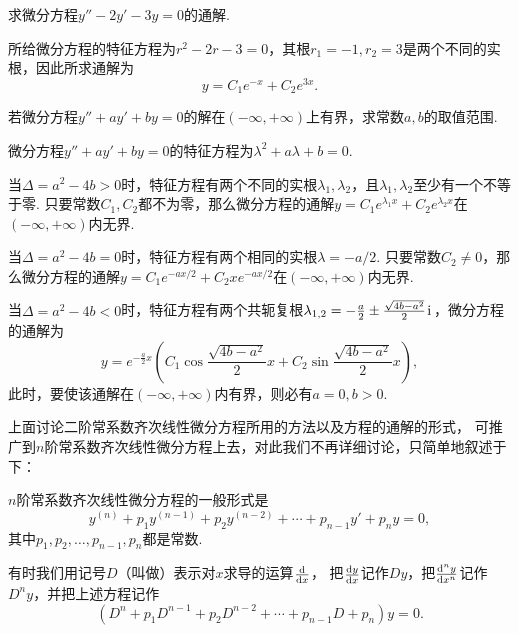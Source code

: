 \begin{example}
求微分方程\(y'' - 2y' - 3y = 0\)的通解.
\begin{solution}
所给微分方程的特征方程为\(r^2-2r-3=0\)，其根\(r_1=-1, r_2=3\)是两个不同的实根，因此所求通解为\[
y = C_1 e^{-x} + C_2 e^{3x}.
\]
\end{solution}
\end{example}

\begin{example}
若微分方程\(y''+ay'+by=0\)的解在\((-\infty,+\infty)\)上有界，求常数\(a,b\)的取值范围.
\begin{solution}
微分方程\(y''+ay'+by=0\)的特征方程为\(\lambda^2 + a\lambda+b = 0\).

当\(\Delta=a^2-4b>0\)时，特征方程有两个不同的实根\(\lambda_1,\lambda_2\)，且\(\lambda_1,\lambda_2\)至少有一个不等于零.
只要常数\(C_1,C_2\)都不为零，那么微分方程的通解\(y = C_1 e^{\lambda_1 x} + C_2 e^{\lambda_2 x}\)在\((-\infty,+\infty)\)内无界.

当\(\Delta=a^2-4b=0\)时，特征方程有两个相同的实根\(\lambda=-a/2\).
只要常数\(C_2\neq0\)，那么微分方程的通解\(y = C_1 e^{-ax/2} + C_2 x e^{-ax/2}\)在\((-\infty,+\infty)\)内无界.

当\(\Delta=a^2-4b<0\)时，特征方程有两个共轭复根\(\lambda_{1,2}=-\frac{a}{2}\pm\frac{\sqrt{4b-a^2}}{2}\kern1pt\mathrm{i}\kern1pt\)，微分方程的通解为\[
y = e^{-\frac{a}{2}x} \left( C_1 \cos\frac{\sqrt{4b-a^2}}{2}x + C_2 \sin\frac{\sqrt{4b-a^2}}{2}x \right),
\]此时，要使该通解在\((-\infty,+\infty)\)内有界，则必有\(a = 0, b > 0\).
\end{solution}
\end{example}

上面讨论二阶常系数齐次线性微分方程所用的方法以及方程的通解的形式，%
可推广到\(n\)阶常系数齐次线性微分方程上去，对此我们不再详细讨论，只简单地叙述于下：

\(n\)阶常系数齐次线性微分方程的一般形式是
\begin{equation}\label{equation:微分方程概论.n阶常系数齐次线性微分方程的一般形式}
y^{(n)} + p_1 y^{(n-1)} + p_2 y^{(n-2)} + \dotsb + p_{n-1} y' + p_n y = 0,
\end{equation}
其中\(p_1,p_2,\dotsc,p_{n-1},p_n\)都是常数.

有时我们用记号\(D\)（叫做）表示对\(x\)求导的运算\(\dv{x}\)，%
把\(\dv{y}{x}\)记作\(Dy\)，把\(\dv[n]{y}{x}\)记作\(D^n y\)，并把上述方程记作
\begin{equation}\label{equation:微分方程概论.n阶常系数齐次线性微分方程的一般形式.用微分算子改写}
(D^n + p_1 D^{n-1} + p_2 D^{n-2} + \dotsb + p_{n-1} D + p_n) y = 0.
\end{equation}

